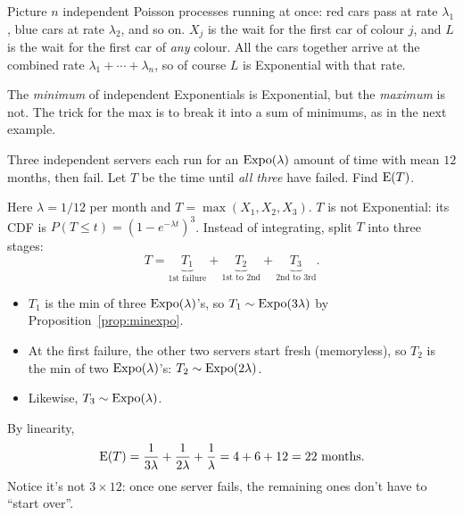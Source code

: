 \begin{intuition}
Picture $n$ independent Poisson processes running at once: red cars pass at rate $\lambda_1$, blue cars at rate $\lambda_2$, and so on. $X_j$ is the wait for the first car of colour $j$, and $L$ is the wait for the first car of \emph{any} colour. All the cars together arrive at the combined rate $\lambda_1 + \cdots + \lambda_n$, so of course $L$ is Exponential with that rate.
\end{intuition}

\begin{pitfall}
The \emph{minimum} of independent Exponentials is Exponential, but the \emph{maximum} is not. The trick for the max is to break it into a sum of minimums, as in the next example.
\end{pitfall}

\begin{example}\label{ex:maxexpo}
Three independent servers each run for an $\operatorname{Expo}(\lambda)$ amount of time with mean $12$ months, then fail. Let $T$ be the time until \emph{all three} have failed. Find $\operatorname{E}(T)$.
\end{example}
\begin{solution}
Here $\lambda = 1/12$ per month and $T = \max(X_1, X_2, X_3)$. $T$ is not Exponential: its CDF is $P(T \le t) = (1 - e^{-\lambda t})^{3}$. Instead of integrating, split $T$ into three stages:
\[
T = \underbrace{T_1}_{\text{1st failure}} + \underbrace{T_2}_{\text{1st to 2nd}} + \underbrace{T_3}_{\text{2nd to 3rd}}.
\]
\begin{itemize}
  \item $T_1$ is the min of three $\operatorname{Expo}(\lambda)$'s, so $T_1 \sim \operatorname{Expo}(3\lambda)$ by Proposition~\ref{prop:minexpo}.
  \item At the first failure, the other two servers start fresh (memoryless), so $T_2$ is the min of two $\operatorname{Expo}(\lambda)$'s: $T_2 \sim \operatorname{Expo}(2\lambda)$.
  \item Likewise, $T_3 \sim \operatorname{Expo}(\lambda)$.
\end{itemize}
By linearity,
\[
\operatorname{E}(T) = \frac{1}{3\lambda} + \frac{1}{2\lambda} + \frac{1}{\lambda} = 4 + 6 + 12 = 22 \text{ months}.
\]
Notice it's not $3 \times 12$: once one server fails, the remaining ones don't have to ``start over''.
\end{solution}


